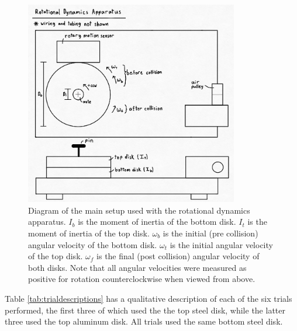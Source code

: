\documentclass[12pt]{iopart} %
\begin{document}
\begin{figure}[htbp]
  \begin{indented}
  \item[]\includegraphics[width=0.83\textwidth]{main-setup-diagram.png}
  \end{indented}
  \caption{\label{fig:mainsetup}
  Diagram of the main setup used with the rotational dynamics apparatus.
  $I_b$ is the moment of inertia of the bottom disk.
  $I_t$ is the moment of inertia of the top disk.
  $\omega_b$ is the initial (pre collision) angular velocity of the bottom disk.
  $\omega_t$ is the initial angular velocity of the top disk.
  $\omega_f$ is the final (post collision) angular velocity of both disks.
  Note that all angular velocities were measured as positive for rotation counterclockwise when viewed from above.
  }
\end{figure}

Table \ref{tab:trialdescriptions} has a qualitative description of each of the six trials performed, the first 
three of which used the the top steel disk, while the latter three used the top aluminum disk.
All trials used the same bottom steel disk.
\end{document}
